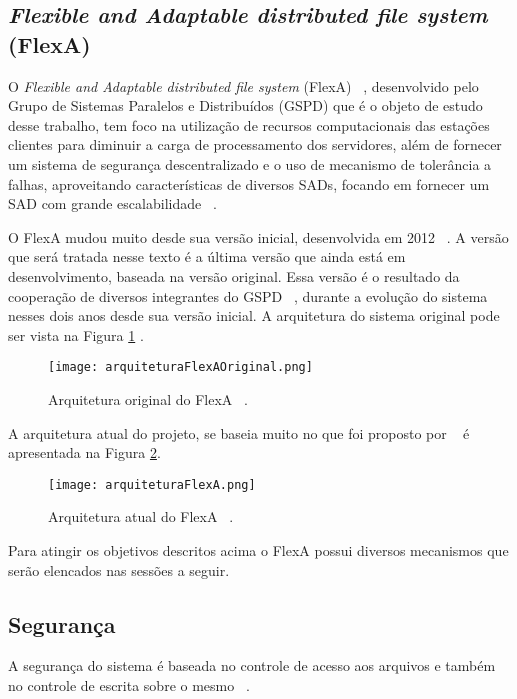     \subsection{\textit{Flexible and Adaptable distributed file system} (FlexA)} \label{flexa}
	 
	 O \textit{Flexible and Adaptable distributed file system} (FlexA) ~\cite{silas}, desenvolvido pelo Grupo de Sistemas Paralelos e Distribuídos (GSPD) que é o objeto de estudo desse trabalho, tem foco na utilização de recursos computacionais das estações clientes para diminuir a carga de processamento dos servidores, além de fornecer um sistema de segurança descentralizado e o uso de mecanismo de tolerância a falhas, aproveitando características de diversos SADs, focando em fornecer um SAD com grande escalabilidade ~\cite{silas}.
	
	 O FlexA mudou muito desde sua versão inicial, desenvolvida em 2012 ~\cite{mario}. A versão que será tratada nesse texto é a última versão que ainda está em desenvolvimento, baseada na versão original. Essa versão é o resultado da cooperação de diversos integrantes do GSPD ~\cite{mario}, durante a evolução do sistema nesses dois anos desde sua versão inicial. A arquitetura do sistema original pode ser vista na Figura \ref{fig:arquiteturaFlexaOriginal} .
	 
	 \begin{figure}
	 \centering
	 \texttt{[image: arquiteturaFlexAOriginal.png]}
	 \caption{Arquitetura original do FlexA ~\cite{silas}.}
	 \label{fig:arquiteturaFlexaOriginal}
	 \end{figure}
	 
	 A arquitetura atual do projeto, se baseia muito no que foi proposto por ~\cite{silas} é apresentada na Figura \ref{fig:arquiteturaFlexa}.
	 
	 \begin{figure}[!ht]
	 \centering
	 \texttt{[image: arquiteturaFlexA.png]}
	 \caption{Arquitetura atual do FlexA ~\cite{mario}.}
	 \label{fig:arquiteturaFlexa}
	 \end{figure}
	 
	 Para atingir os objetivos descritos acima o FlexA possui diversos mecanismos que serão elencados nas sessões a seguir.
	 
	 \subsection{Segurança}
	    A segurança do sistema é baseada no controle de acesso aos arquivos e também no controle de escrita sobre o mesmo ~\cite{silas}.
	 
